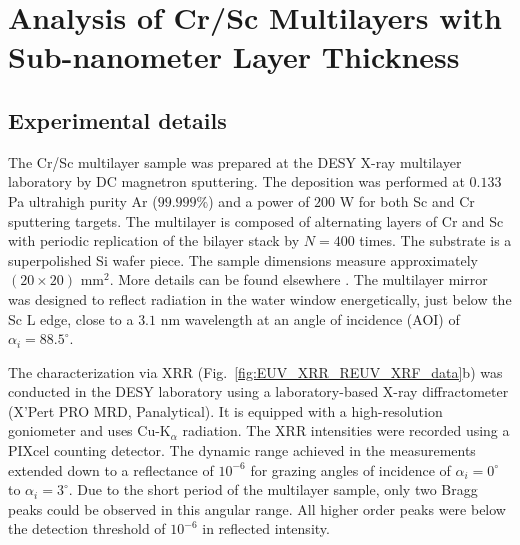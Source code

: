 \section{Analysis of Cr/Sc Multilayers with Sub-nanometer Layer Thickness}

\subsection{Experimental details} \label{sec:experimental}

The Cr/Sc multilayer sample was prepared at the DESY X-ray multilayer 
laboratory by DC magnetron sputtering. The deposition was performed at $0.133$ 
Pa ultrahigh purity Ar ($99.999\%$) and a power of $200$ W for both Sc and Cr 
sputtering targets. The multilayer is composed of alternating layers of Cr and 
Sc with periodic replication of the bilayer stack by $N=400$ times. The 
substrate is a superpolished Si wafer piece. The sample dimensions measure 
approximately $(20 \times 20)$ mm$^2$. More details can be found elsewhere 
\cite{prasciolu_thermal_2014}. The multilayer mirror was designed to reflect 
radiation in the water window energetically, just below the Sc L edge, close to 
a $3.1$ nm wavelength at an angle of incidence (AOI) of $\alpha_i = 
88.5^\circ$.

The characterization via XRR (Fig.~\ref{fig:EUV_XRR_REUV_XRF_data}b) was 
conducted in the DESY laboratory using a laboratory-based X-ray diffractometer 
(X'Pert PRO MRD, Panalytical). It is equipped with a high-resolution goniometer 
and uses Cu-K$_\alpha$ radiation. The XRR intensities were recorded using a 
PIXcel counting detector. The dynamic range achieved in the measurements 
extended down to a reflectance of $10^{-6}$ for grazing angles of incidence of 
$\alpha_i=0^\circ$ to $\alpha_i=3^\circ$. Due to the short period of the 
multilayer sample, only two Bragg peaks could be observed in this angular 
range. All higher order peaks were below the detection threshold of $10^{-6}$ 
in reflected intensity.

